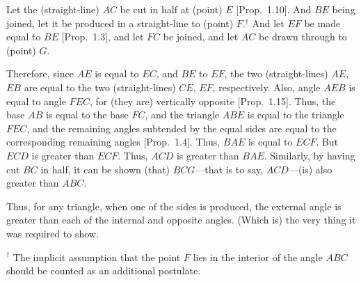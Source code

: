 \begin{Parallel}{}{}
{ Let the (straight-line) $AC$ be cut in half at (point) $E$ [Prop.~1.10].
 And $BE$ being joined, let it be produced in a straight-line to
 (point) $F$.$^\dag$ And let $EF$ be made equal to $BE$ [Prop.~1.3], and let $FC$ be joined, and let $AC$ be drawn through to (point) $G$.
 
\epsfysize=2.7in
\centerline{}

 Therefore, since $AE$ is equal to $EC$, and $BE$ to $EF$, the two (straight-lines)
 $AE$, $EB$ are equal to the two (straight-lines) $CE$, $EF$, respectively. 
 Also, angle $AEB$ is equal to angle $FEC$, for (they are)
 vertically opposite [Prop.~1.15]. Thus, the base $AB$ is equal to the base
 $FC$, and the triangle $ABE$ is equal to the triangle $FEC$, and the remaining
 angles subtended by the equal sides are equal to the corresponding remaining angles [Prop.~1.4]. Thus, $BAE$ is equal to $ECF$. But $ECD$ is greater than $ECF$. Thus,
 $ACD$ is greater than $BAE$. Similarly, by having cut $BC$ in half,  it can  be shown (that) $BCG$---that is to say, $ACD$---(is) also greater than $ABC$.
 
 Thus, for any triangle, when one of the sides is produced, the external angle
is greater than each of the internal and opposite angles. (Which is) the very thing
it was required to show.}
\end{Parallel}
{\footnotesize
\noindent $^\dag$  The implicit assumption that the point $F$ lies in the
 interior of the angle $ABC$ should be counted as an additional postulate.} 
 
